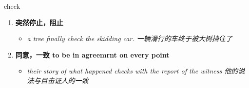 
\begin{frame}
{\huge check}
\begin{center}
\begin{enumerate}\Large
  \item \textbf{突然停止，阻止}
  \begin{itemize}
    \item \em{\Large{a tree finally check the skidding car. 一辆滑行的车终于被大树挡住了}}
  \end{itemize}
  \item \textbf{同意，一致 to be in agreemrnt on every point}
  \begin{itemize}
    \item \em{\Large{their story of what happened checks with the report of the witness 他的说法与目击证人的一致}}
  \end{itemize}
\end{enumerate}
\end{center}
\end{frame}
